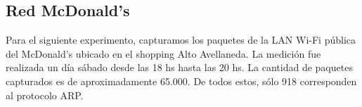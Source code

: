 \subsection{Red McDonald's}

Para el siguiente experimento, capturamos los paquetes de la LAN Wi-Fi pública del McDonald's ubicado en el shopping Alto Avellaneda. La medición fue realizada un día sábado desde las 18 hs hasta las 20 hs. La cantidad de paquetes capturados es de aproximadamente 65.000. De todos estos, sólo 918 corresponden al protocolo ARP.


